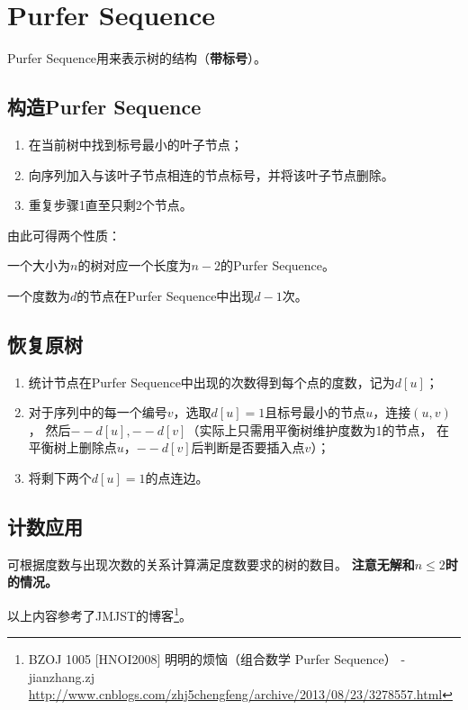 \section{Purfer Sequence}
Purfer Sequence用来表示树的结构（{\bfseries 带标号}）。
\subsection{构造Purfer Sequence}
\begin{enumerate}
	\item 在当前树中找到标号最小的叶子节点；
	\item 向序列加入与该叶子节点相连的节点标号，并将该叶子节点删除。
	\item 重复步骤1直至只剩2个节点。
\end{enumerate}
由此可得两个性质：
\begin{property}[唯一性]
	一个大小为$n$的树对应一个长度为$n-2$的Purfer Sequence。
\end{property}
\begin{property}
	一个度数为$d$的节点在Purfer Sequence中出现$d-1$次。
\end{property}
\subsection{恢复原树}
\begin{enumerate}
	\item 统计节点在Purfer Sequence中出现的次数得到每个点的度数，记为$d[u]$；
	\item 对于序列中的每一个编号$v$，选取$d[u]=1$且标号最小的节点$u$，连接$(u,v)$，
		  然后$--d[u],--d[v]$（实际上只需用平衡树维护度数为1的节点，
		  在平衡树上删除点$u$，$--d[v]$后判断是否要插入点$v$）；
	\item 将剩下两个$d[u]=1$的点连边。
\end{enumerate}
\subsection{计数应用}
可根据度数与出现次数的关系计算满足度数要求的树的数目。
{\bfseries 注意无解和$n\leq 2$时的情况。}

以上内容参考了JMJST的博客\footnote{
	BZOJ 1005 [HNOI2008] 明明的烦恼（组合数学 Purfer Sequence） - jianzhang.zj
	\url{http://www.cnblogs.com/zhj5chengfeng/archive/2013/08/23/3278557.html}
}。
